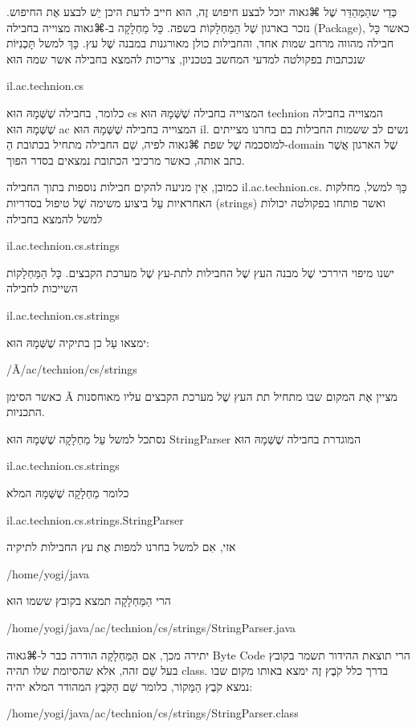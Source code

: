 כְּדֵי שהַמְּהַדֵּר שֶׁל ⌘גאוה יוכל לבצע חיפוש זֶה, הוּא חייב לדעת היכן יֵשׁ לבצע
אֶת החיפוש. נזכר בארגון שֶׁל הַמַּחְלָקוֹת בשפה. כָּל מַחְלָקָה ב-⌘גאוה מצוייה
בחבילה (Package), כאשר כָּל חבילה מהווה מרחב שמות אחד, והחבילות כולן מאורגנות
במבנה שֶׁל עץ. כָּךְ למשל תָּכְנִיּוֹת שנכתבות בפקולטה למדעי המחשב בטכניון,
צריכות להמצא בחבילה אשר שמה הוּא

il.ac.technion.cs

כלומר, בחבילה שֶׁשְּׁמָהּ הוּא cs המצוייה בחבילה שֶׁשְּׁמָהּ הוּא technion
המצוייה בחבילה שֶׁשְּׁמָהּ הוּא ac המצוייה בחבילה שֶׁשְּׁמָהּ הוּא il. נשים לב
ששמות החבילות בם בחרנו מצייתים למוסכמה שֶׁל שפת ⌘גאוה לפיה, שֵׁם החבילה מתחיל
בכתובת הַ-domain שֶׁל הארגון אֲשֶׁר כתב אותה, כאשר מרכיבי הכתובת נמצאים בסדר
הפוך.

כמובן, אֵין מניעה להקים חבילות נוספות בתוך החבילה il.ac.technion.cs. כָּךְ למשל,
מחלקות האחראיות עַל ביצוע משימה שֶׁל טיפול בסדריות (strings) ואשר פותחו בפקולטה
יכולות למשל להמצא בחבילה

il.ac.technion.cs.strings

ישנו מיפוי היררכי שֶׁל מבנה העץ שֶׁל החבילות לתת-עץ שֶׁל מערכת הקבצים. כָּל
הַמַּחְלָקוֹת השייכות לחבילה

 il.ac.technion.cs.strings

ימצאו עַל כן בתיקיה שֶׁשְּׁמָהּ הוּא:

/Ã/ac/technion/cs/strings

כאשר הסימן Ã מציין אֶת המקום שבו מתחיל תת העץ שֶׁל מערכת הקבצים עליו מאוחסנות
התכניות.

נסתכל למשל עַל מַחְלָקָה שֶׁשְּׁמָהּ הוּא StringParser המוגדרת בחבילה
שֶׁשְּׁמָהּ הוּא

 il.ac.technion.cs.strings

כלומר מַחְלָקָה שֶׁשְּׁמָהּ המלא

il.ac.technion.cs.strings.StringParser

אזי, אִם למשל בחרנו למפות אֶת עץ החבילות לתיקיה

 /home/yogi/java

הרי הַמַּחְלָקָה תמצא בקובץ ששמו הוּא

/home/yogi/java/ac/technion/cs/strings/StringParser.java

יתירה מכך, אִם הַמַּחְלָקָה הודרה כבר ל-⌘גאוה Byte Code הרי תוצאת ההידור תשמר
בקובץ בעל שֵׁם זהה, אלא שהסיומת שלו תהיה class. בדרך כלל קֹבֶץ זֶה ימצא באותו
מקום שבו נמצא קֹבֶץ הַמָּקוֹר, כלומר שֵׁם הַקֹּבֶץ המהודר המלא יהיה:

/home/yogi/java/ac/technion/cs/strings/StringParser.class

